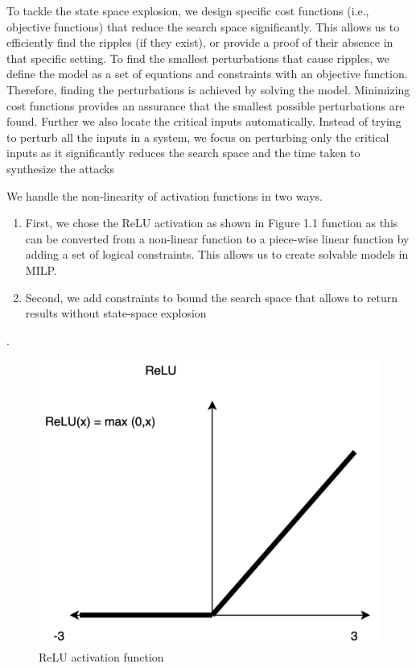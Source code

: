 To tackle the state space explosion, we design \attack specific cost functions (i.e., objective functions) that reduce the search space significantly. This allows us to efficiently find the ripples (if they exist), or provide a proof of their absence in that specific setting. To find the smallest perturbations that cause  ripples, we define the model as a set of equations and constraints with an objective function. Therefore, finding the perturbations is achieved by solving the model. Minimizing cost functions provides an assurance that the smallest possible perturbations are found. %
Further we also locate the critical inputs automatically. Instead of trying to perturb all the inputs in a system, we focus on perturbing only the critical %
inputs as it significantly reduces the search space and the time taken to synthesize the attacks %

We handle the non-linearity of activation functions in two ways. 
\begin{enumerate}
	\item First, we chose the ReLU activation as shown in Figure 1.1 function as this can be converted from a non-linear function to a piece-wise linear function by adding a set of logical constraints. This allows us to create solvable models in MILP.
	\item Second, we add constraints to bound the search space that allows \tool to return results without state-space explosion
\end{enumerate}
 . %

\begin{figure}
	\centering
		\includegraphics[width=0.7\linewidth]{Images/ReLU}
	\caption[Activation functions]{ReLU activation function}
	\label{fig:ReLU}
\end{figure}


